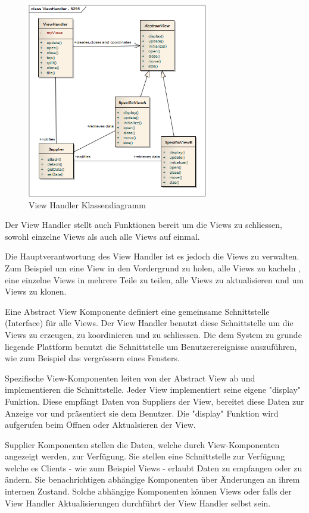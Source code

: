\begin{figure}[H]
	\centering
	\includegraphics[width=0.7\textwidth]{content/posa1/images/view-handler-classes.png}
	\caption{View Handler Klassendiagramm}
\end{figure}


Der View Handler stellt auch Funktionen bereit um die Views zu schliessen, sowohl einzelne Views als auch alle Views auf einmal.

Die Hauptverantwortung des View Handler ist es jedoch die Views zu verwalten. Zum Beispiel um eine View in den Vordergrund zu holen, alle Views zu kacheln , eine einzelne Views in mehrere Teile zu teilen, alle Views zu aktualisieren und um Views zu klonen.

Eine Abstract View Komponente definiert eine gemeinsame Schnittstelle (Interface) für alle Views. Der View Handler benutzt diese Schnittstelle um die Views zu erzeugen, zu koordinieren und zu schliessen. Die dem System zu grunde liegende Plattform benutzt die Schnittstelle um Benutzerereignisse auszuführen, wie zum Beispiel das vergrössern eines Fensters.

Spezifische View-Komponenten leiten von der Abstract View ab und implementieren die Schnittstelle. Jeder View implementiert seine eigene "display" Funktion. Diese empfängt Daten von Suppliers der View, bereitet diese Daten zur Anzeige vor und präsentiert sie dem Benutzer. Die "display" Funktion wird aufgerufen beim Öffnen oder Aktualsieren der View.

Supplier Komponenten stellen die Daten, welche durch View-Komponenten angezeigt werden, zur Verfügung. Sie stellen eine Schnittstelle zur Verfügung welche es Clients - wie zum Beispiel Views - erlaubt Daten zu empfangen oder zu ändern. Sie benachrichtigen abhängige Komponenten über Änderungen an ihrem internen Zustand. Solche abhängige Komponenten können Views oder falls der View Handler Aktualisierungen durchführt der View Handler selbst sein.

